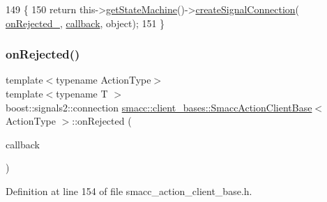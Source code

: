 \begin{DoxyCode}
149     \{
150         \textcolor{keywordflow}{return} this->\hyperlink{classsmacc_1_1ISmaccClient_aec51d4712404cb9882b86e4c854bb93a}{getStateMachine}()->\hyperlink{classsmacc_1_1ISmaccStateMachine_adf0f42ade0c65cc471960fe2a7c42da2}{createSignalConnection}(
      \hyperlink{classsmacc_1_1client__bases_1_1SmaccActionClientBase_a4c878cbf2684701323e2b36668f7d721}{onRejected\_}, \hyperlink{sm__ridgeback__barrel__search__1_2servers_2opencv__perception__node_2opencv__perception__node_8cpp_a050e697bd654facce10ea3f6549669b3}{callback}, \textcolor{keywordtype}{object});
151     \}
\end{DoxyCode}
\mbox{\label{classsmacc_1_1client__bases_1_1SmaccActionClientBase_af6f191d1b1612d57082aa278db1f7be4}} 
\subsubsection{\texorpdfstring{on\+Rejected()}{onRejected()}\hspace{0.1cm}{\footnotesize\ttfamily [2/2]}}
{\footnotesize\ttfamily template$<$typename Action\+Type$>$ \\
template$<$typename T $>$ \\
boost\+::signals2\+::connection \hyperlink{classsmacc_1_1client__bases_1_1SmaccActionClientBase}{smacc\+::client\+\_\+bases\+::\+Smacc\+Action\+Client\+Base}$<$ Action\+Type $>$\+::on\+Rejected (\begin{DoxyParamCaption}\item[{std\+::function$<$ void(Result\+Const\+Ptr \&)$>$}]{callback }\end{DoxyParamCaption})\hspace{0.3cm}{\ttfamily [inline]}}



Definition at line 154 of file smacc\+\_\+action\+\_\+client\+\_\+base.\+h.


